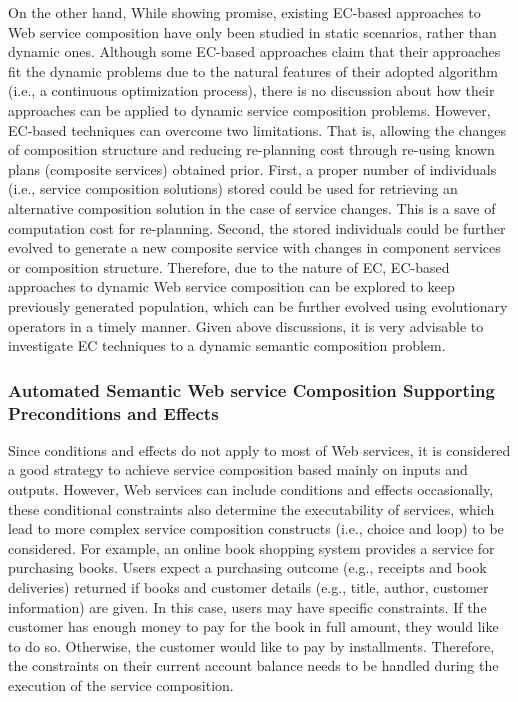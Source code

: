 On the other hand, While showing promise, existing EC-based approaches to Web service composition have only been studied in static scenarios, rather than dynamic ones. Although some EC-based approaches \cite{feng2013dynamic,liu2005dynamic} claim that their approaches fit the dynamic problems due to the natural features of their adopted algorithm (i.e., a continuous optimization process), there is no discussion about how their approaches can be applied to dynamic service composition problems. However, EC-based techniques can overcome two limitations. That is, allowing the changes of composition structure and reducing re-planning cost through re-using known plans (composite services) obtained prior. First, a proper number of individuals (i.e., service composition solutions) stored could be used for retrieving an alternative composition solution in the case of service changes. This is a save of computation cost for re-planning. Second, the stored individuals could be further evolved to generate a new composite service with changes in component services or composition structure. Therefore, due to the nature of EC, EC-based approaches to dynamic Web service composition can be explored to keep previously generated population, which can be further evolved using evolutionary operators in a timely manner. Given above discussions, it is very advisable to investigate EC techniques to a dynamic semantic composition problem.


\subsubsection{Automated Semantic Web service Composition Supporting Preconditions and Effects}

Since conditions and effects do not apply to most of Web services, it is considered a good strategy to achieve service composition based mainly on inputs and outputs. However, Web services can include conditions and effects occasionally, these conditional constraints also determine the executability of services, which lead to more complex service composition constructs (i.e., choice and loop) to be considered. For example, an online book shopping system \cite{wang2014automated} provides a service for purchasing books. Users expect a purchasing outcome (e.g., receipts and book deliveries) returned if books and customer details (e.g., title, author, customer information) are given. In this case, users may have specific constraints. If the customer has enough money to pay for the book in full amount, they would like to do so. Otherwise, the customer would like to pay by installments. Therefore, the constraints on their current account balance needs to be handled during the execution of the service composition.

